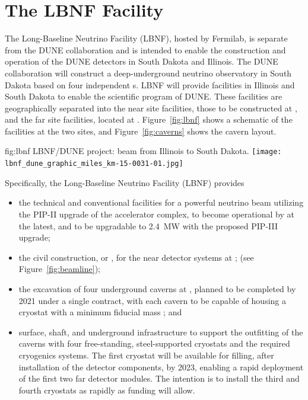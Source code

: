 \section{The LBNF Facility} 

The Long-Baseline Neutrino
Facility (LBNF), hosted by Fermilab, is separate from the DUNE collaboration and is intended to enable the construction and operation of the DUNE detectors in South Dakota and Illinois.
The DUNE collaboration will construct a deep-underground neutrino observatory in South Dakota based on four independent \nominalmodsize \lartpc{}s. %
LBNF will provide facilities in Illinois and South Dakota to enable the scientific program of DUNE.
These facilities are geographically separated into the near site facilities, those to be constructed
at \fnal, and the far site facilities, located at \surf. Figure~\ref{fig:lbnf} shows
a schematic of the facilities at the two sites, and Figure~\ref{fig:caverns} shows the cavern layout. 

\begin{dunefigure}{fig:lbnf}{ 	
LBNF/DUNE project: beam from Illinois to South Dakota.}
\texttt{[image: lbnf\_dune\_graphic\_miles\_km-15-0031-01.jpg]}
\end{dunefigure}

Specifically, the Long-Baseline Neutrino Facility (LBNF) provides
\begin{itemize}

\item  the  technical and conventional facilities for a powerful  neutrino beam utilizing the PIP-II upgrade of the \fnal accelerator 
complex, to become operational by \beamturnon  
at the latest, and to be upgradable to \SI{2.4}{\MW} with the proposed 
PIP-III upgrade;

\item  the civil construction, or , for the near detector systems at \fnal; (see Figure~\ref{fig:beamline}); 

\item the excavation of four underground caverns at \surf, planned to be completed 
by 2021 
under a single contract, with each cavern to be capable of housing a cryostat with 
a minimum \nominalmodsize fiducial mass \lartpc; and



\item surface, shaft, and underground infrastructure to support 
the outfitting of the caverns with four free-standing, steel-supported cryostats 
and the required cryogenics systems. The first cryostat will be available for filling, after installation of the detector components, by
2023, enabling a rapid deployment of the first two \nominalmodsize far detector modules. 
The intention is to install the third and fourth cryostats as rapidly as funding will 
allow.

\end{itemize}

